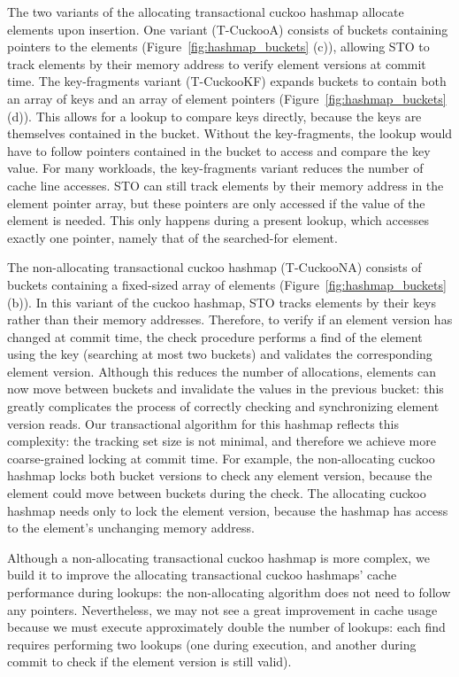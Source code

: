 The two variants of the allocating transactional cuckoo hashmap allocate elements upon insertion. One variant (T-CuckooA) consists of buckets containing pointers to the elements (Figure~\ref{fig:hashmap_buckets} (c)), allowing STO to track elements by their memory address to verify element versions at commit time. The key-fragments variant (T-CuckooKF) expands buckets to contain both an array of keys and an array of element pointers (Figure~\ref{fig:hashmap_buckets} (d)). This allows for a lookup to compare keys directly, because the keys are themselves contained in the bucket. Without the key-fragments, the lookup would have to follow pointers contained in the bucket to access and compare the key value. For many workloads, the key-fragments variant reduces the number of cache line accesses. STO can still track elements by their memory address in the element pointer array, but these pointers are only accessed if the value of the element is needed. This only happens during a present lookup, which accesses exactly one pointer, namely that of the searched-for element.

The non-allocating transactional cuckoo hashmap (T-CuckooNA) consists of buckets containing a fixed-sized array of elements (Figure~\ref{fig:hashmap_buckets} (b)). In this variant of the cuckoo hashmap, STO tracks elements by their keys rather than their memory addresses. Therefore, to verify if an element version has changed at commit time, the check procedure performs a find of the element using the key (searching at most two buckets) and validates the corresponding element version. Although this reduces the number of allocations, elements can now move between buckets and invalidate the values in the previous bucket: this greatly complicates the process of correctly checking and synchronizing element version reads. Our transactional algorithm for this hashmap reflects this complexity: the tracking set size is not minimal, and therefore we achieve more coarse-grained locking at commit time. For example, the non-allocating cuckoo hashmap locks both bucket versions to check any element version, because the element could move between buckets during the check. The allocating cuckoo hashmap needs only to lock the element version, because the hashmap has access to the element's unchanging memory address. 

Although a non-allocating transactional cuckoo hashmap is more complex, we build it to improve the allocating transactional cuckoo hashmaps' cache performance during lookups: the non-allocating algorithm does not need to follow any pointers. Nevertheless, we may not see a great improvement in cache usage because we must execute approximately double the number of lookups: each find requires performing two lookups (one during execution, and another during commit to check if the element version is still valid).


